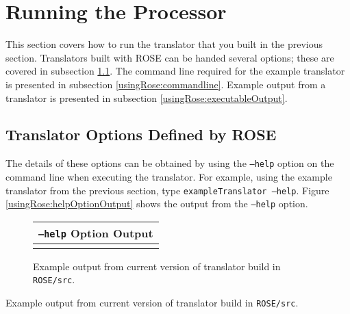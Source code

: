 \section{Running the Processor}

   This section covers how to run the translator that you built in the previous
section.  Translators built with ROSE can be handed several options; these are covered
in subsection \ref{usingRose:options}.  The command line required for the example
translator is presented in subsection \ref{usingRose:commandline}.  Example
output from a translator is presented in subsection
\ref{usingRose:executableOutput}.

\subsection{Translator Options Defined by ROSE}
\label{usingRose:options}
The details of
these options can be obtained by using the {\tt --help} option on the command line when
executing the translator.  For example, using the example translator from the 
previous section, type {\tt exampleTranslator --help}.  Figure
\ref{usingRose:helpOptionOutput} shows the output from the {\tt --help} option.


{\indent
{\mySmallFontSize

\begin{latexonly}
\begin{figure}[tb]
\begin{center}
\begin{tabular}{|c|} \hline
     {\tt --help} Option Output
\\\hline\hline
   
\\\hline
\end{tabular}
\end{center}
\caption{ Example output from current version of translator build in {\tt ROSE/src}. }
\end{figure}
\end{latexonly}

\begin{htmlonly}
   
   \vspace{0.5in}
   Example output from current version of translator build in {\tt ROSE/src}.
\end{htmlonly}

\label{usingRose:helpOptionOutput}

}
}

